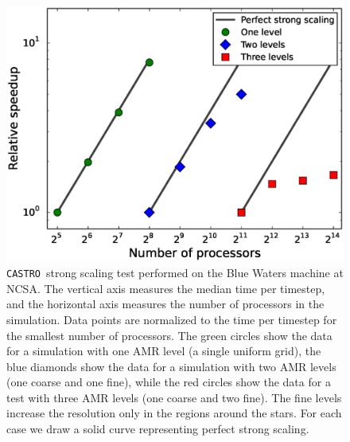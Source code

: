 \documentclass[iop,numberedappendix]{../emulateapj}
\newcommand{\castro}{\texttt{CASTRO}}
\begin{document}
\begin{figure}
  \centering
  \includegraphics[scale=0.4]{plots/strong_scaling}
  \caption{\castro\ strong scaling test performed on the Blue Waters machine at
    NCSA. The vertical axis measures the median time per timestep, and the 
    horizontal axis measures the number of processors in the simulation. Data 
    points are normalized to the time per timestep for the smallest number 
    of processors. The green circles show the data for a simulation with one 
    AMR level (a single uniform grid), the blue diamonds show the data for a simulation with two AMR
    levels (one coarse and one fine), while the red circles show the data 
    for a test with three AMR levels (one coarse and two fine). The fine levels 
    increase the resolution only in the regions around the stars. For each case 
    we draw a solid curve representing perfect strong scaling.\label{fig:strong_scaling}}
\end{figure}
\end{document}

